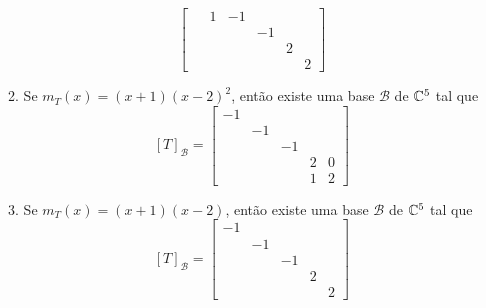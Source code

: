 \begin{exemplo}
\begin{enumerate}[label={\arabic*})]
\begin{solucao}
\begin{enumerate}
\[\begin{bmatrix}
                    \phantom{-}1 & -1 & & & \\
                    & & -1 & &\\
                    & & & 2 & \\
                    & & & & 2
                \end{bmatrix}
                \]
                \item Se $m_T(x) = (x + 1)(x - 2)^2$, ent\~ao existe uma base $\mathcal{B}$ de $\mathbb{C}^5$ tal que
                \[
                    [T]_\mathcal{B} = \begin{bmatrix}
                    -1 & & & &\\
                    & -1 & & & \\
                    & & -1 & &\\
                    & & & 2 & 0\\
                    & & & 1 & 2
                \end{bmatrix}
                \]
                \item Se $m_T(x) = (x + 1)(x - 2)$, ent\~ao existe uma base $\mathcal{B}$ de $\mathbb{C}^5$ tal que
                \[
                    [T]_\mathcal{B} = \begin{bmatrix}
                    -1 & & & &\\
                    & -1 & & & \\
                    & & -1 & &\\
                    & & & 2 &\\
                    & & & & 2
                \end{bmatrix}
                \]
            \end{enumerate}


\end{solucao}
\end{enumerate}
\end{exemplo}
